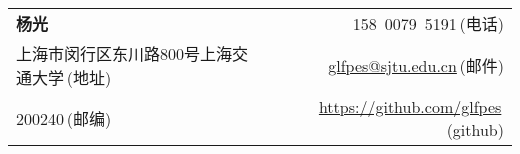 \newcommand{\myheader}{
\begin{tabular*}{\textwidth}{l@{\extracolsep{\fill}}r}
  \textbf{\LARGE 杨光}& 158~0079~5191$\,${\color{labelgrey}(电话)} \\
  上海市闵行区东川路800号上海交通大学$\,${\color{labelgrey}(地址)} & \href{mailto:glfpes@sjtu.edu.cn}{glfpes@sjtu.edu.cn}$\,${\color{labelgrey}(邮件)} \\
  200240$\,${\color{labelgrey}(邮编)} & \href{https://github.com/glfpes}{https://github.com/glfpes}$\,${\color{labelgrey}(github)} \\
  \end{tabular*}\\\vspace{0.1in}}

\myheader